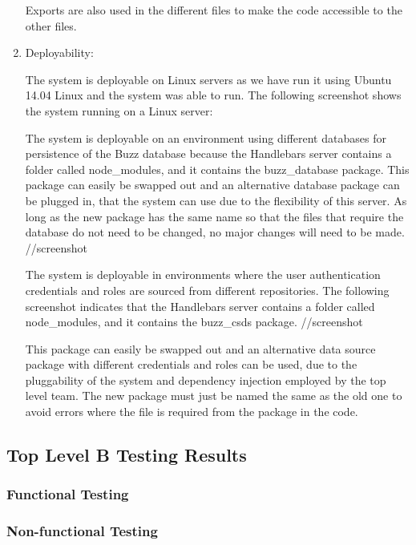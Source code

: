 \documentclass[hidelinks, 12pt, oneside]{article}
\begin{document}
\begin{enumerate}
Exports are also used in the different files to make the code accessible to the other files.

\item Deployability:

The system is deployable on Linux servers as we have run it using Ubuntu 14.04 Linux and the system was able to run. The following screenshot shows the system running on a Linux server:

The system is deployable on an environment using different databases for persistence of the Buzz database because the Handlebars server contains a folder called node\_modules, and it contains the buzz\_database package. This package can easily be swapped out and an alternative database package can be plugged in, that the system can use due to the flexibility of this server. As long as the new package has the same name so that the files that require the database do not need to be changed, no major changes will need to be made.  
//screenshot

The system is deployable in environments where the user authentication credentials and roles are sourced from different repositories. The following screenshot indicates that the Handlebars server contains a folder called node\_modules, and it contains the buzz\_csds package. 
//screenshot

This package can easily be swapped out and an alternative data source package with different credentials and roles can be used, due to the pluggability of the system and dependency injection employed by the top level team. The new package must just be named the same as the old one to avoid errors where the file is required from the package in the code. 

\end{enumerate}


\subsection{Top Level B Testing Results}

\subsubsection{Functional Testing}

\begin{enumerate}

\end{enumerate}

\subsubsection{Non-functional Testing} 

\begin{enumerate}






\end{enumerate}
\end{document}
